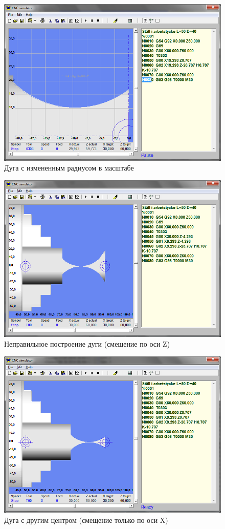 \begin{figure}[ht]
\centering
	\includegraphics[width=.9\linewidth]{3.png}
    \caption{Дуга с измененным радиусом в масштабе\label{fig:closeup}}
\end{figure}

\begin{figure}[ht]
\centering
	\includegraphics[width=.9\linewidth]{4.png}
    \caption{Неправильное построение дуги (смещение по оси Z)\label{fig:changedz}}
\end{figure}

\begin{figure}[ht]
\centering
	\includegraphics[width=.9\linewidth]{5.png}
    \caption{Дуга с другим центром (смещение только по оси X)\label{fig:changedx}}
\end{figure}

